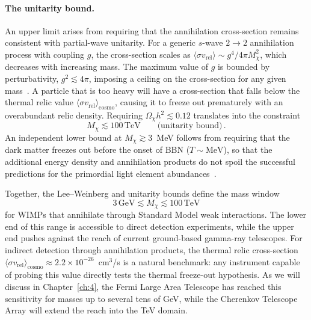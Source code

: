 \paragraph{The unitarity bound.}
An upper limit arises from requiring that the annihilation cross-section remains consistent with partial-wave unitarity.
For a generic $s$-wave $2 \to 2$ annihilation process with coupling $g$, the cross-section scales as $\langle \sigma v_\mathrm{rel} \rangle \sim g^4 / 4\pi M_\chi^2$, which decreases with increasing mass.
The maximum value of $g$ is bounded by perturbativity, $g^2 \lesssim 4\pi$, imposing a ceiling on the cross-section for any given mass~\cite{Cirelli:2024ssz}.
A particle that is too heavy will have a cross-section that falls below the thermal relic value $\langle \sigma v_\mathrm{rel} \rangle_\mathrm{cosmo}$, causing it to freeze out prematurely with an overabundant relic density.
Requiring $\Omega_\chi h^2 \lesssim 0.12$ translates into the constraint~\cite{Cirelli:2024ssz,Griest:1989wd}
\begin{equation}
	M_\chi \lesssim 100 \, \mathrm{TeV} \qquad \text{(unitarity bound)} \,.
	\label{eq:unitarity}
\end{equation}
An independent lower bound at $M_\chi \gtrsim 3$~MeV follows from requiring that the dark matter freezes out before the onset of BBN ($T \sim \mathrm{MeV}$), so that the additional energy density and annihilation products do not spoil the successful predictions for the primordial light element abundances~\cite{Nollett:2014lwa}.

Together, the Lee--Weinberg and unitarity bounds define the mass window
\begin{equation}
	3 \, \mathrm{GeV} \lesssim M_\chi \lesssim 100 \, \mathrm{TeV}
	\label{eq:wimp_window}
\end{equation}
for WIMPs that annihilate through Standard Model weak interactions.
The lower end of this range is accessible to direct detection experiments, while the upper end pushes against the reach of current ground-based gamma-ray telescopes.
For indirect detection through annihilation products, the thermal relic cross-section $\langle \sigma v_\mathrm{rel} \rangle_\mathrm{cosmo} \approx 2.2 \times 10^{-26}$~cm$^3$/s is a natural benchmark: any instrument capable of probing this value directly tests the thermal freeze-out hypothesis.
As we will discuss in Chapter~\ref{ch:4}, the Fermi Large Area Telescope has reached this sensitivity for masses up to several tens of GeV, while the Cherenkov Telescope Array will extend the reach into the TeV domain.

